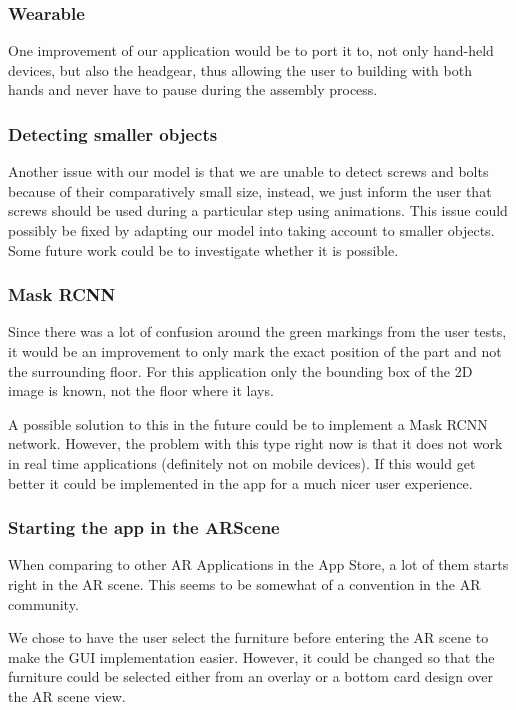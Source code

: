 \subsubsection{Wearable}
One improvement of our application would be to port it to, not only hand-held devices, but also the headgear, thus allowing the user to building with both hands and never have to pause during the assembly process.

\subsubsection{Detecting smaller objects}
Another issue with our model is that we are unable to detect screws and bolts because of their 
comparatively small size, instead, we just inform the user that screws should be used during a particular step using animations.
This issue could possibly be fixed by adapting our model into taking account to smaller objects.
Some future work could be to investigate whether it is possible.

\subsubsection{Mask RCNN}
Since there was a lot of confusion around the green markings from the user tests, it would be an
improvement to only mark the exact position of the part and not the surrounding floor.
For this application only the bounding box of the 2D image is known, not the floor where it lays.

A possible solution to this in the future could be to implement a Mask RCNN network. However, 
the problem with this type right now is that it does not work in real time applications (definitely not on mobile devices).
If this would get better it could be implemented in the app for a much nicer user experience.

\subsubsection{Starting the app in the ARScene}
When comparing to other AR Applications in the App Store, a lot of them starts right in the AR 
scene. This seems to be somewhat of a convention in the AR community.

We chose to have the user select the furniture before entering the AR scene to make the GUI
implementation easier. However, it could be changed so that the furniture could be selected
either from an overlay or a bottom card design over the AR scene view.

